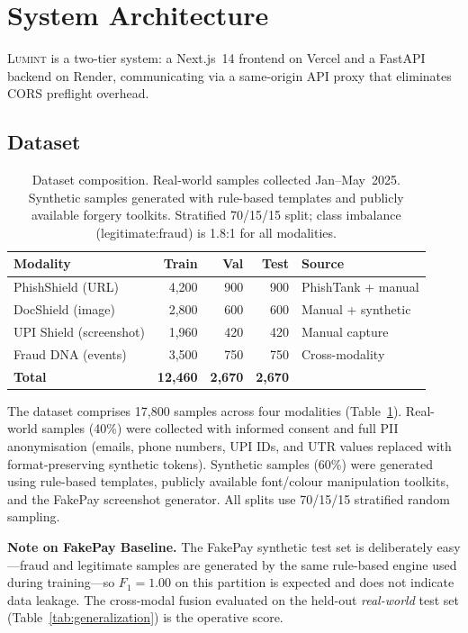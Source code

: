 \documentclass[conference]{IEEEtran}
\begin{document}
\section{System Architecture}\label{sec:architecture}

\textsc{Lumint} is a two-tier system: a Next.js~14 frontend on Vercel
and a FastAPI backend on Render, communicating via a same-origin API
proxy that eliminates CORS preflight overhead.

\subsection{Dataset}\label{sec:dataset}

\begin{table}[t]
\caption{Dataset composition. Real-world samples collected
Jan--May~2025. Synthetic samples generated with rule-based templates
and publicly available forgery toolkits. Stratified 70/15/15 split;
class imbalance (legitimate:fraud) is 1.8:1 for all modalities.}
\label{tab:dataset}
\centering
\small
\begin{tabular}{lrrrp{1.6cm}}
\toprule
\textbf{Modality} & \textbf{Train} & \textbf{Val} & \textbf{Test}
  & \textbf{Source} \\
\midrule
PhishShield (URL)       & 4{,}200 & 900 & 900 & PhishTank + manual \\
DocShield (image)       & 2{,}800 & 600 & 600 & Manual + synthetic \\
UPI Shield (screenshot) & 1{,}960 & 420 & 420 & Manual capture \\
Fraud DNA (events)      & 3{,}500 & 750 & 750 & Cross-modality \\
\midrule
\textbf{Total}          & \textbf{12{,}460} & \textbf{2{,}670}
  & \textbf{2{,}670} & \\
\bottomrule
\end{tabular}
\end{table}

The dataset comprises 17{,}800 samples across four modalities
(Table~\ref{tab:dataset}).
Real-world samples (40\%) were collected with informed consent and full
PII anonymisation (emails, phone numbers, UPI IDs, and UTR values
replaced with format-preserving synthetic tokens).
Synthetic samples (60\%) were generated using rule-based templates,
publicly available font/colour manipulation toolkits, and the FakePay
screenshot generator.
All splits use 70/15/15 stratified random sampling.

\textbf{Note on FakePay Baseline.}
The FakePay synthetic test set is deliberately easy---fraud and
legitimate samples are generated by the same rule-based engine used
during training---so $F_1{=}1.00$ on this partition is expected and
does not indicate data leakage.
The cross-modal fusion evaluated on the held-out \emph{real-world} test
set (Table~\ref{tab:generalization}) is the operative score.
\end{document}
